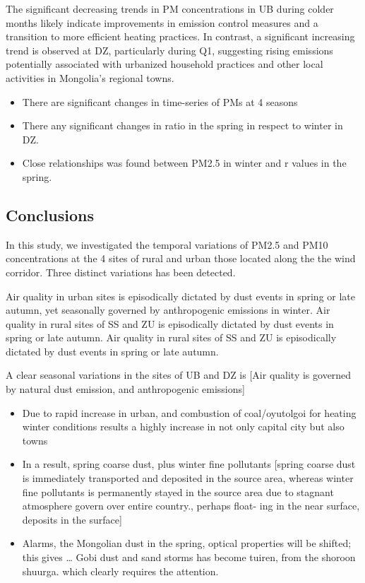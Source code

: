 \documentclass[
  11pt,
]{article}
\providecommand{\tightlist}{%
  \setlength{\itemsep}{0pt}\setlength{\parskip}{0pt}}
\begin{document}
The significant decreasing trends in PM concentrations in UB during
colder months likely indicate improvements in emission control measures
and a transition to more efficient heating practices. In contrast, a
significant increasing trend is observed at DZ, particularly during Q1,
suggesting rising emissions potentially associated with urbanized
household practices and other local activities in Mongolia's regional
towns.

\begin{itemize}
\tightlist
\item
  There are significant changes in time-series of PMs at 4 seasons
\item
  There any significant changes in ratio in the spring in respect to
  winter in DZ.
\item
  Close relationships was found between PM2.5 in winter and r values in
  the spring.
\end{itemize}

\subsection{Conclusions}\label{conclusions}

In this study, we investigated the temporal variations of PM2.5 and PM10
concentrations at the 4 sites of rural and urban those located along the
the wind corridor. Three distinct variations has been detected.

Air quality in urban sites is episodically dictated by dust events in
spring or late autumn, yet seasonally governed by anthropogenic
emissions in winter. Air quality in rural sites of SS and ZU is
episodically dictated by dust events in spring or late autumn. Air
quality in rural sites of SS and ZU is episodically dictated by dust
events in spring or late autumn.

A clear seasonal variations in the sites of UB and DZ is {[}Air quality
is governed by natural dust emission, and anthropogenic emissions{]}

\begin{itemize}
\tightlist
\item
  Due to rapid increase in urban, and combustion of coal/oyutolgoi for
  heating winter conditions results a highly increase in not only
  capital city but also towns
\item
  In a result, spring coarse dust, plus winter fine pollutants {[}spring
  coarse dust is immediately transported and deposited in the source
  area, whereas winter fine pollutants is permanently stayed in the
  source area due to stagnant atmosphere govern over entire country.,
  perhaps float- ing in the near surface, deposits in the surface{]}
\item
  Alarms, the Mongolian dust in the spring, optical properties will be
  shifted; this gives \ldots{} Gobi dust and sand storms has become
  tuiren, from the shoroon shuurga. which clearly requires the
  attention.
\end{itemize}
\end{document}

